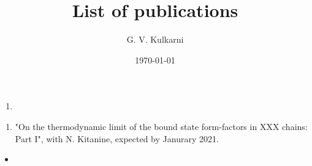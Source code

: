 \documentclass{scrarticle}
\title{List of publications}
\author{G. V. Kulkarni}
\date{\today}
\begin{document}
\maketitle
{}
\begin{enumerate}
    \item {}
\end{enumerate}
\begin{enumerate}
    \item "On the thermodynamic limit of the bound state form-factors in XXX chains: Part I", with N. Kitanine, expected by Janurary 2021.
\end{enumerate}
\begin{itemize}
    \item
    \end{itemize}
\end{document}

